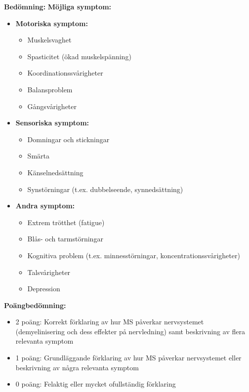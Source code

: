 \documentclass{exam}
\newenvironment{answer}
  {\begin{framed}\color{blue}\textbf{Bedömning:} }
  {\end{framed}}
\begin{document}
\begin{questions}
\begin{answer}
\textbf{Möjliga symptom:}
\begin{itemize}
  \item \textbf{Motoriska symptom:}
  \begin{itemize}
    \item Muskelsvaghet
    \item Spasticitet (ökad muskelspänning)
    \item Koordinationssvårigheter
    \item Balansproblem
    \item Gångsvårigheter
  \end{itemize}
  
  \item \textbf{Sensoriska symptom:}
  \begin{itemize}
    \item Domningar och stickningar
    \item Smärta
    \item Känselnedsättning
    \item Synstörningar (t.ex. dubbelseende, synnedsättning)
  \end{itemize}
  
  \item \textbf{Andra symptom:}
  \begin{itemize}
    \item Extrem trötthet (fatigue)
    \item Blås- och tarmstörningar
    \item Kognitiva problem (t.ex. minnesstörningar, koncentrationssvårigheter)
    \item Talsvårigheter
    \item Depression
  \end{itemize}
\end{itemize}

\textbf{Poängbedömning:}
\begin{itemize}
  \item 2 poäng: Korrekt förklaring av hur MS påverkar nervsystemet (demyelinisering och dess effekter på nervledning) samt beskrivning av flera relevanta symptom
  \item 1 poäng: Grundläggande förklaring av hur MS påverkar nervsystemet eller beskrivning av några relevanta symptom
  \item 0 poäng: Felaktig eller mycket ofullständig förklaring
\end{itemize}
\end{answer}
\vspace{5mm}


\end{questions}
\end{document}
